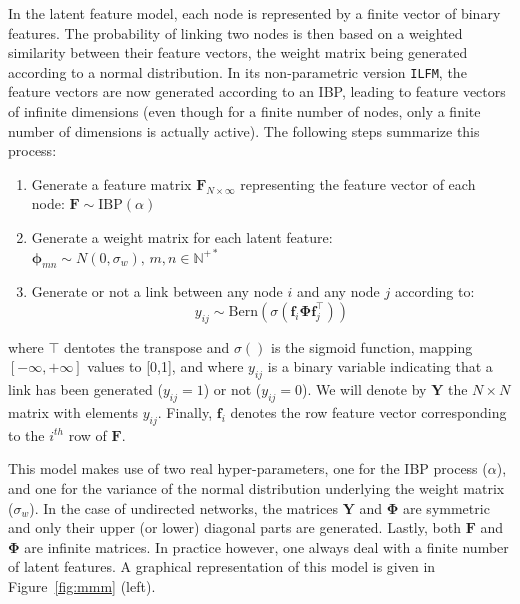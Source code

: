 \documentclass[journal]{IEEEtran}
\newcommand{\ifm}{\texttt{ILFM}}
\newcommand{\IBP}{\mathrm{IBP}}
\newcommand{\mat}[1]{\mathbf{#1}}
\begin{document}
In the latent feature model, each node is represented by a finite vector of binary features. The probability of linking two nodes is then based on a weighted similarity between their feature vectors, the weight matrix being generated according to a normal distribution. In its non-parametric version \ifm, the feature vectors are now generated according to an IBP, leading to feature vectors of infinite dimensions (even though for a finite number of nodes, only a finite number of dimensions is actually active). The following steps summarize this process:~\\
%
\begin{enumerate}
\item Generate a feature matrix $\mat{F}_{N \times \infty}$ representing the feature vector of each node: $\mat{F} \sim \IBP(\alpha)$
\item Generate a weight matrix for each latent feature:\\
 $\mat{\phi}_{mn} \sim N(0, \sigma_w), \, m,n \in \mathbb{N}^{+*}$
\item Generate or not a link between any node $i$ and any node $j$ according to: 
%
\begin{equation}
y_{ij} \sim \mathrm{Bern}(\sigma(\mat{f}_{i} \mat{\Phi} \mat{f}_{j}^\top))
\label{eq:link-ilfm}
\end{equation}
\end{enumerate}
%
where $\top$ dentotes the transpose and  $\sigma()$ is the sigmoid function, mapping $[-\infty, +\infty]$ values to [0,1], and where $y_{ij}$ is a binary variable indicating that a link has been generated ($y_{ij}=1$) or not ($y_{ij}=0$). We will denote by $\mat{Y}$ the $N \times N$ matrix with elements $y_{ij}$. Finally, $\mat{f}_{i}$ denotes the row feature vector corresponding to the $i^{th}$ row of $\mat{F}$.

This model makes use of two real hyper-parameters, one for the IBP process ($\alpha$), and one for the variance of the normal distribution underlying the weight matrix ($\sigma_w$). In the case of undirected networks, the matrices $\mat{Y}$ and $\mat{\Phi}$ are symmetric and only their upper (or lower) diagonal parts are generated. Lastly, both $\mat{F}$ and $\mat{\Phi}$ are infinite matrices. In practice however, one always deal with a finite number of latent features. A graphical representation of this model is given in Figure~\ref{fig:mmm} (left).
\end{document}
